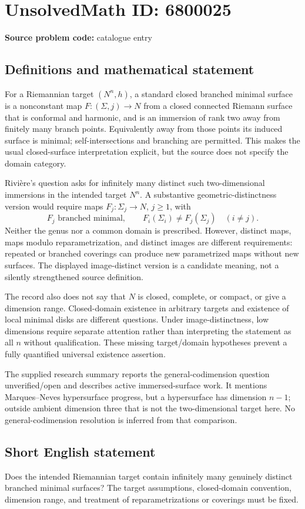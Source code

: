 \documentclass[11pt]{article}
\begin{document}
\section*{UnsolvedMath ID: 6800025}
\textbf{Source problem code:} catalogue entry
\subsection{Definitions and mathematical statement}
For a Riemannian target \((N^n,h)\), a standard closed branched minimal surface is a nonconstant map \(F:(\Sigma,j)\to N\) from a closed connected Riemann surface that is conformal and harmonic, and is an immersion of rank two away from finitely many branch points. Equivalently away from those points its induced surface is minimal; self-intersections and branching are permitted. This makes the usual closed-surface interpretation explicit, but the source does not specify the domain category.

Rivière's question asks for infinitely many distinct such two-dimensional immersions in the intended target \(N^n\). A substantive geometric-distinctness version would require maps \(F_j:\Sigma_j\to N\), \(j\ge1\), with
\[
F_j\text{ branched minimal},\qquad
F_i(\Sigma_i)\ne F_j(\Sigma_j)\quad(i\ne j).
\]
Neither the genus nor a common domain is prescribed. However, distinct maps, maps modulo reparametrization, and distinct images are different requirements: repeated or branched coverings can produce new parametrized maps without new surfaces. The displayed image-distinct version is a candidate meaning, not a silently strengthened source definition.

The record also does not say that \(N\) is closed, complete, or compact, or give a dimension range. Closed-domain existence in arbitrary targets and existence of local minimal disks are different questions. Under image-distinctness, low dimensions require separate attention rather than interpreting the statement as all \(n\) without qualification. These missing target/domain hypotheses prevent a fully quantified universal existence assertion.

The supplied research summary reports the general-codimension question unverified/open and describes active immersed-surface work. It mentions Marques--Neves hypersurface progress, but a hypersurface has dimension \(n-1\); outside ambient dimension three that is not the two-dimensional target here. No general-codimension resolution is inferred from that comparison.
\subsection{Short English statement}
Does the intended Riemannian target contain infinitely many genuinely distinct branched minimal surfaces? The target assumptions, closed-domain convention, dimension range, and treatment of reparametrizations or coverings must be fixed.
\end{document}
